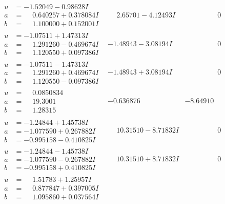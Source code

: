 \documentclass[1p]{elsarticle_modified}
\theoremstyle{definition}
\begin{document}
$$\begin{array}{c|c|c}
\begin{aligned}
u &= -1.52049 - 0.98628 I \\
a &= \phantom{-}0.640257 + 0.378084 I \\
b &= \phantom{-}1.100000 + 0.152001 I\end{aligned}
 & \phantom{-}2.65701 - 4.12493 I & \phantom{-0.000000 } 0 \\ \hline\begin{aligned}
u &= -1.07511 + 1.47313 I \\
a &= \phantom{-}1.291260 - 0.469674 I \\
b &= \phantom{-}1.120550 + 0.097386 I\end{aligned}
 & -1.48943 - 3.08194 I & \phantom{-0.000000 } 0 \\ \hline\begin{aligned}
u &= -1.07511 - 1.47313 I \\
a &= \phantom{-}1.291260 + 0.469674 I \\
b &= \phantom{-}1.120550 - 0.097386 I\end{aligned}
 & -1.48943 + 3.08194 I & \phantom{-0.000000 } 0 \\ \hline\begin{aligned}
u &= \phantom{-}0.0850834\phantom{ +0.000000I} \\
a &= \phantom{-}19.3001\phantom{ +0.000000I} \\
b &= \phantom{-}1.28315\phantom{ +0.000000I}\end{aligned}
 & -0.636876\phantom{ +0.000000I} & -8.64910\phantom{ +0.000000I} \\ \hline\begin{aligned}
u &= -1.24844 + 1.45738 I \\
a &= -1.077590 + 0.267882 I \\
b &= -0.995158 - 0.410825 I\end{aligned}
 & \phantom{-}10.31510 - 8.71832 I & \phantom{-0.000000 } 0 \\ \hline\begin{aligned}
u &= -1.24844 - 1.45738 I \\
a &= -1.077590 - 0.267882 I \\
b &= -0.995158 + 0.410825 I\end{aligned}
 & \phantom{-}10.31510 + 8.71832 I & \phantom{-0.000000 } 0 \\ \hline\begin{aligned}
u &= \phantom{-}1.51783 + 1.25957 I \\
a &= \phantom{-}0.877847 + 0.397005 I \\
b &= \phantom{-}1.095860 + 0.037564 I\end{aligned}

\end{array}$$
\end{document}
